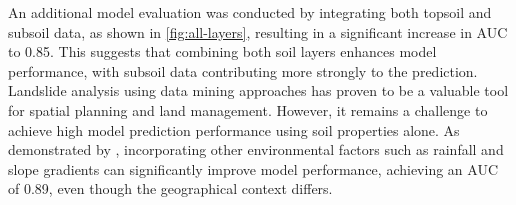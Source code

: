 An additional model evaluation was conducted by integrating both topsoil and subsoil data, as shown in \ref{fig:all-layers}, resulting in a significant increase in AUC to 0.85. This suggests that combining both soil layers enhances model performance, with subsoil data contributing more strongly to the prediction. Landslide analysis using data mining approaches has proven to be a valuable tool for spatial planning and land management. However, it remains a challenge to achieve high model prediction performance using soil properties alone. As demonstrated by \cite{disc07}, incorporating other environmental factors such as rainfall and slope gradients can significantly improve model performance, achieving an AUC of 0.89, even though the geographical context differs.


